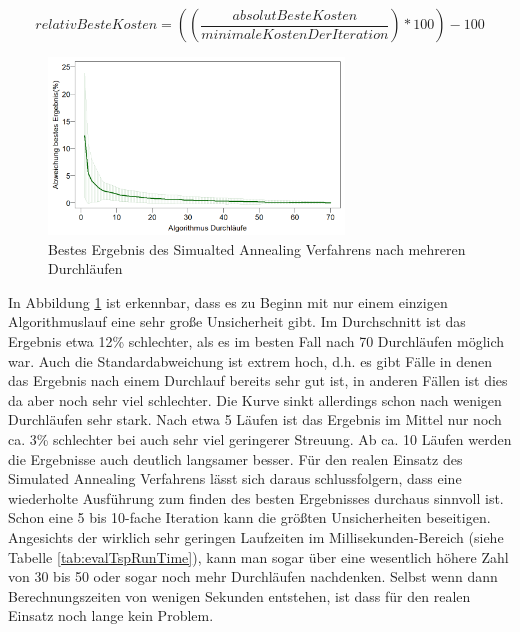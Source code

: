 \begin{equation} \label{eq:simaResBestCost}
relativ Beste Kosten = \left(\left(\frac{absolut Beste Kosten}{minimale Kosten Der Iteration}\right)*100\right)-100
\end{equation}

\begin{figure}[H]
    \centering
    \includegraphics[width=0.7\textwidth]{images/graphs/tspResultSpreadTest.png}
    \caption{Bestes Ergebnis des Simualted Annealing Verfahrens nach mehreren Durchläufen}
    \label{fig:tspEvalSpread}
\end{figure}


In Abbildung \ref{fig:tspEvalSpread} ist erkennbar, dass es zu Beginn mit nur einem einzigen Algorithmuslauf eine sehr große Unsicherheit gibt. Im Durchschnitt ist das Ergebnis etwa 12\% schlechter, als es im besten Fall nach 70 Durchläufen möglich war. Auch die Standardabweichung ist extrem hoch, d.h. es gibt Fälle in denen das Ergebnis nach einem Durchlauf bereits sehr gut ist, in anderen Fällen ist dies da aber noch sehr viel schlechter. Die Kurve sinkt allerdings schon nach wenigen Durchläufen sehr stark. Nach etwa 5 Läufen ist das Ergebnis im Mittel nur noch ca. 3\% schlechter bei auch sehr viel geringerer Streuung. Ab ca. 10 Läufen werden die Ergebnisse auch deutlich langsamer besser.  Für den realen Einsatz des Simulated Annealing Verfahrens lässt sich daraus schlussfolgern, dass eine wiederholte Ausführung zum finden des besten Ergebnisses durchaus sinnvoll ist. Schon eine 5 bis 10-fache Iteration kann die größten Unsicherheiten beseitigen. Angesichts der wirklich sehr geringen Laufzeiten im Millisekunden-Bereich (siehe Tabelle \ref{tab:evalTspRunTime}), kann man sogar über eine wesentlich höhere Zahl von 30 bis 50 oder sogar noch mehr Durchläufen nachdenken. Selbst wenn dann Berechnungszeiten von wenigen Sekunden entstehen, ist dass für den realen Einsatz noch lange kein Problem.


